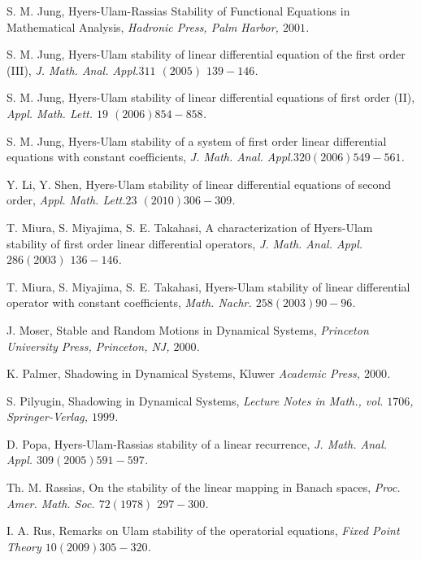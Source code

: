 \documentclass[a4paper,12pt]{report}
\begin{document}
\begin{thebibliography}
S. M. Jung, Hyers-Ulam-Rassias Stability of Functional Equations in Mathematical Analysis, \textit{Hadronic Press, Palm Harbor, $2001$.}

S. M. Jung, Hyers-Ulam stability of linear differential  equation of the first order (III), \textit{J. Math. Anal. Appl.$ 311$ $(2005)$ $139-146$.}

S. M. Jung, Hyers-Ulam stability of linear differential equations of first order (II), \textit{Appl. Math. Lett. $19$ $(2006) 854-858$.}

S. M. Jung, Hyers-Ulam stability of a system of first order linear differential equations with constant coefficients, \textit{J. Math. Anal. Appl.$ 320 (2006) 549-561$.}

Y. Li, Y. Shen, Hyers-Ulam stability of linear differential \linebreak equations of second order, \textit{Appl. Math. Lett.$ 23$ $(2010) 306-309$.}

T. Miura, S. Miyajima, S. E. Takahasi, A characterization of Hyers-Ulam stability of first order linear differential operators, \linebreak \textit{J. Math. Anal. Appl. $286 (2003)$ $136-146$.}

T. Miura, S. Miyajima, S. E. Takahasi, Hyers-Ulam stability of linear differential operator with constant coefficients, \textit{Math. Nachr. $258 (2003) 90-96$.}

J. Moser, Stable and Random Motions in Dynamical Systems, \textit{Princeton University Press, Princeton, NJ, $2000$.}

K. Palmer, Shadowing in Dynamical Systems, Kluwer \linebreak \textit{Academic Press, $2000$.}

S. Pilyugin, Shadowing in Dynamical Systems, \textit{Lecture Notes in Math., vol. $1706$, Springer-Verlag, $1999$.}

D. Popa, Hyers-Ulam-Rassias stability of a linear recurrence, \linebreak \textit{J. Math. Anal. Appl. $309 (2005) 591-597$.}

Th. M. Rassias, On the stability of the linear mapping in \linebreak Banach spaces, \textit{Proc. Amer. Math. Soc. $72 (1978)$ $297-300$.}

I. A. Rus, Remarks on Ulam stability of the operatorial \linebreak equations, \textit{Fixed Point Theory $10 (2009) 305-320$.}


\end{thebibliography}
\end{document}
